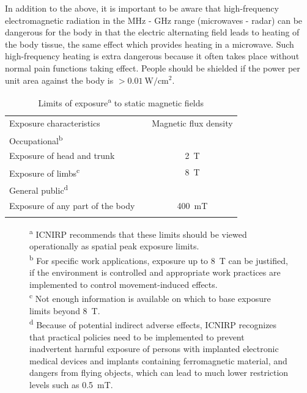 \documentclass[../Elmag-labhefte-2020.tex]{subfiles}
\begin{document}
In addition to the above, it is important to be aware that high-frequency electromagnetic radiation in the \si{\mega\hertz} - \si{\giga\hertz} range (microwaves - radar) can be dangerous for the body in that the electric alternating field leads to heating of the body tissue, the same effect which provides heating in a microwave. Such high-frequency heating is extra dangerous because it often takes place without normal pain functions taking effect. People should be shielded if the power per unit area against the body is $> \SI{0,01}{\watt/\cm\squared}$.

\begin{table}[!ht]
    \begin{center}
    \caption{Limits of exposure\textsuperscript{a} to static magnetic fields}
    \label{tab:exposurlimits}
        \begin{tabular}{ l  c  c }
        \hline
        \noalign{\bigskip}
        \qquad\qquad Exposure characteristics &  & Magnetic flux density  \\
        \noalign{\medskip}
        \hline
        \noalign{\medskip}
        Occupational\textsuperscript{b} &  &  \\ 
        \noalign{\smallskip}
            \quad Exposure of head and trunk&   &  \SI{2}{\tesla} \\ 
            \quad Exposure of limbs\textsuperscript{c} & &  \SI{8}{\tesla}\\
        \noalign{\medskip}
        General public\textsuperscript{d} &  &  \\ 
        \quad Exposure of any part of the body& & \SI{400}{\milli\tesla}\\
        \noalign{\medskip}
        \hline
        \noalign{\medskip}
        \end{tabular}
    \end{center}
    \vspace*{-0.7cm}
\end{table}
%
\begin{figure}[!ht]
    \centering
    \begin{minipage}[t]{0.7\textwidth}
    \footnotesize{
        \textsuperscript{a} ICNIRP recommends that these limits should be viewed operationally as spatial peak exposure limits.\\
        \textsuperscript{b} For specific work applications, exposure up to \SI{8}{\tesla} can be justified, if the environment is controlled and appropriate work practices are implemented to control movement-induced effects.\\
        \textsuperscript{c} Not enough information is available on which to base exposure limits beyond \SI{8}{\tesla}.\\
        \textsuperscript{d} Because of potential indirect adverse effects, ICNIRP recognizes that practical policies need to be implemented to prevent inadvertent harmful exposure of persons with implanted electronic medical devices and implants containing ferromagnetic material, and dangers from flying objects, which can lead to much lower restriction levels such as \SI[output-decimal-marker = {.}]{0.5}{\milli\tesla}.
    }
    \end{minipage}
\end{figure}
\end{document}
